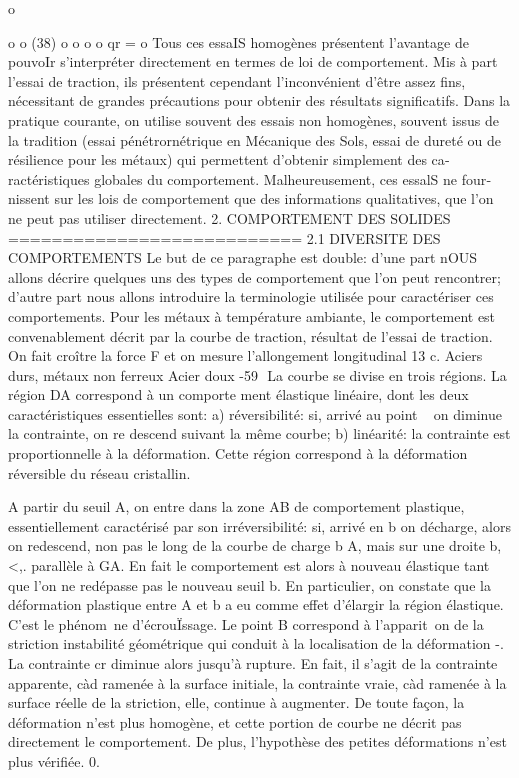 o 

o o 
(38) 
o o o o 
qr =
o 
Tous ces essaIS homogènes présentent l'avantage de pouvoIr s'inter­préter directement en termes de loi de comportement. Mis à part l'essai de traction, ils présentent cependant l'inconvénient d'être assez fins, nécessi­tant de grandes précautions pour obtenir des résultats significatifs. Dans la pratique courante, on utilise souvent des essais non homogènes, souvent issus de la tradition (essai pénétrornétrique en Mécanique des Sols, essai de dureté ou de résilience pour les métaux) qui permettent d'obtenir simplement des ca­ractéristiques globales du comportement. Malheureusement, ces essalS ne four­nissent sur les lois de comportement que des informations qualitatives, que l'on ne peut pas utiliser directement. 
2. COMPORTEMENT DES SOLIDES 
=========================== 
2.1 DIVERSITE DES COMPORTEMENTS 
Le but de ce paragraphe est double: d'une part nOUS allons décrire quelques uns des types de comportement que l'on peut rencontrer; d'autre part nous allons introduire la terminologie utilisée pour caractériser ces compor­tements. 
Pour les métaux à température ambiante, le comportement est convena­blement décrit par la courbe de traction, résultat de l'essai de traction. On fait croître la force F et on mesure l'allongement longitudinal 
13 
c. 
Aciers durs, métaux non ferreux
Acier doux 
-59 ­
La courbe se divise en trois régions. La région DA correspond à un comporte­
ment élastique linéaire, dont les deux caractéristiques essentielles sont: 
a) réversibilité: si, arrivé au point ~ on diminue la contrainte, on re­
descend suivant la même courbe; 
b) linéarité: la contrainte est proportionnelle à la déformation. 
Cette région correspond à la déformation réversible du réseau cristallin. 

A partir du seuil A, on entre dans la zone AB de comportement plastique, essentiellement caractérisé par son irréversibilité: si, arrivé en b on décharge, alors on redescend, non pas le long de la courbe de char­ge b A, mais sur une droite b,<,. parallèle à GA. En fait le comportement est alors à nouveau élastique tant que l'on ne redépasse pas le nouveau seuil 
b. En particulier, on constate que la déformation plastique entre A et b a eu comme effet d'élargir la région élastique. C'est le phénom~ne d'écrouÏs­sage. 
Le point B correspond à l'apparit~on de la striction instabilité géométrique qui conduit à la localisation de la déformation -. La contrainte cr diminue alors jusqu'à rupture. En fait, il s'agit de la contrainte appa­rente, càd ramenée à la surface initiale, la contrainte vraie, càd ramenée à la surface réelle de la striction, elle, continue à augmenter. De toute façon, la déformation n'est plus homogène, et cette portion de courbe ne décrit pas directement le comportement. De plus, l'hypothèse des petites dé­formations n'est plus vérifiée. 
0. 

